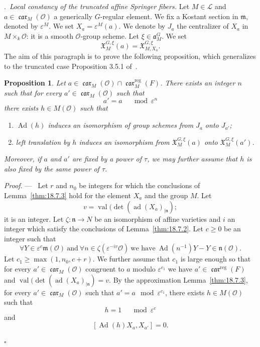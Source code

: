 \documentclass[12pt,a4paper,oneside,english,leqno]{smfart}
\makeatletter
\numberwithin{equation}{subsection}
\newcounter{theo}
\numberwithin{theo}{subsection}
\newenvironment{paragr}[1][]{\medskip\refstepcounter{subsection}%
  \par\noindent\hspace*{\parindent}\thesubsection.\ \emph{#1}%
  \@ifundefined{@empty}{}{}\ignorespaces}{\medskip}
\theoremstyle{plain}
\newtheorem{proposition}[theo]{Proposition}
\theoremstyle{definition}
\theoremstyle{remark}
\newenvironment{preuve}[1][]{\medskip\noindent\textit{Proof.} #1 ---\ }%
  {\hfill\ensuremath{\square}\medskip}
\DeclareMathOperator{\reg}{reg}
\DeclareMathOperator{\Ad}{Ad}
\DeclareMathOperator{\ad}{ad}
\DeclareMathOperator{\val}{val}
\DeclareMathOperator{\car}{\mathfrak{car}}
\newcommand{\oc}{\mathcal{O}}
\newcommand{\lc}{\mathcal{L}}
\newcommand{\mgo}{\mathfrak{m}}
\newcommand{\ngo}{\mathfrak{n}}
\newcommand{\ago}{\mathfrak{a}}
\newcommand{\Xgo}{\mathfrak{X}}
\newcommand{\eps}{\varepsilon}
\renewcommand{\geq}{\geqslant}
\makeatother
\begin{document}
\begin{paragr}[Local constancy of the truncated affine Springer fibers.]\label{S:18.7}
Let $M\in\lc$ and $a\in\car_M(\oc)$ a generically $G$-regular element. We fix a Kostant section in $\mgo$, denoted by $\eps^M$. We set $X_a=\eps^M(a)$. We denote by $J_a$ the centralizer of $X_a$ in $M\times_k\oc$: it is a smooth $\oc$-group scheme. Let $\xi\in\ago_M^G$. We set
$$
\Xgo_M^{G,\xi}(a)=\Xgo_{M,X_a}^{G,\xi}.
$$
The aim of this paragraph is to prove the following proposition, which generalizes to the truncated case Proposition 3.5.1 of~\cite{Ngo-lemme}.

\begin{proposition}\label{thm:18.7.1}
Let $a\in\car_M(\oc)\cap\car_M^{\reg}(F)$. There exists an integer $n$ such that for every $a'\in\car_M(\oc)$ such that
$$
a'=a\quad\mod\eps^n
$$
there exists $h\in M(\oc)$ such that
\begin{enumerate}
\item $\Ad(h)$ induces an isomorphism of group schemes from $J_a$ onto $J_{a'}$; \item left translation by $h$ induces an isomorphism from $\Xgo_M^{G,\xi}(a)$ onto $\Xgo_M^{G,\xi}(a')$.
\end{enumerate}
Moreover, if $a$ and $a'$ are fixed by a power of $\tau$, we may further assume that $h$ is also fixed by the same power of $\tau$.
\end{proposition}

\begin{preuve}
Let $r$ and $n_0$ be integers for which the conclusions of Lemma~\ref{thm:18.7.3} hold for the element $X_a$ and the group $M$. Let
$$
v=\val(\det(\ad(X_a)_{|\ngo});
$$
it is an integer. Let $\zeta:\ngo\to N$ be an isomorphism of affine varieties and $i$ an integer which satisfy the conclusions of Lemma~\ref{thm:18.7.2}. Let $c\geq 0$ be an integer such that
\begin{equation}\label{eq:18.7.1}
\forall Y\in\eps^c\mgo(\oc)\ \text{and}\ \forall n\in\zeta(\eps^{-iv}\oc)
\ \text{we have}\ \Ad(n^{-1})Y-Y\in\ngo(\oc).
\end{equation}
Let $c_1\geq\max(1,n_0,c+r)$. We further assume that $c_1$ is large enough so that for every $a'\in\car_M(\oc)$ congruent to $a$ modulo $\eps^{c_1}$ we have $a'\in\car^{\reg}(F)$ and $\val(\det(\ad(X_a)_{|\ngo})=v$. By the approximation Lemma~\ref{thm:18.7.3}, for every $a'\in\car_M(\oc)$ such that $a'=a \mod\eps^{c_1}$, there exists $h\in M(\oc)$ such that
\begin{equation}\label{eq:18.7.2}
h=1\quad\mod\eps^c
\end{equation}
and
\begin{equation}\label{eq:18.7.3}
[\Ad(h)X_a,X_{a'}]=0.
\end{equation}


\end{preuve}
\end{paragr}
\end{document}
